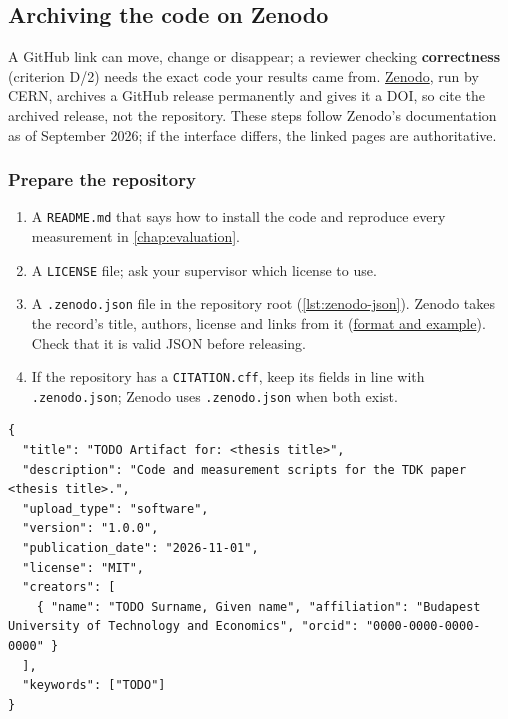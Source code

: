 \subsection{Archiving the code on Zenodo}\label{app:zenodo}
A GitHub link can move, change or disappear; a reviewer checking \textbf{correctness} (criterion D/2) needs the exact code your results came from.
\href{https://zenodo.org/}{Zenodo}, run by CERN, archives a GitHub release permanently and gives it a DOI, so cite the archived release, not the repository.
These steps follow Zenodo's documentation as of September 2026; if the interface differs, the linked pages are authoritative.

\subsubsection{Prepare the repository}
\begin{enumerate}
  \item A \texttt{README.md} that says how to install the code and reproduce every measurement in \cref{chap:evaluation}.
  \item A \texttt{LICENSE} file; ask your supervisor which license to use.
  \item A \texttt{.zenodo.json} file in the repository root (\cref{lst:zenodo-json}). Zenodo takes the record's title, authors, license and links from it (\href{https://help.zenodo.org/docs/github/describe-software/zenodo-json/}{format and example}). Check that it is valid JSON before releasing.
  \item If the repository has a \texttt{CITATION.cff}, keep its fields in line with \texttt{.zenodo.json}; Zenodo uses \texttt{.zenodo.json} when both exist.
\end{enumerate}

\begin{listing}[!ht]
\begin{verbatim}
{
  "title": "TODO Artifact for: <thesis title>",
  "description": "Code and measurement scripts for the TDK paper <thesis title>.",
  "upload_type": "software",
  "version": "1.0.0",
  "publication_date": "2026-11-01",
  "license": "MIT",
  "creators": [
    { "name": "TODO Surname, Given name", "affiliation": "Budapest University of Technology and Economics", "orcid": "0000-0000-0000-0000" }
  ],
  "keywords": ["TODO"]
}
\end{verbatim}
\caption{A minimal \texttt{.zenodo.json}.}\label{lst:zenodo-json}
\end{listing}

